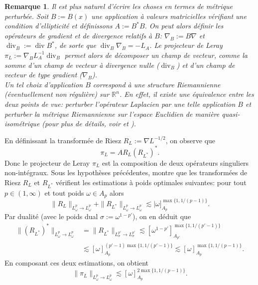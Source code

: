 \documentclass[11pt]{amsart}
\newtheorem*{remark}{Remarque}
\DeclareMathOperator{\dive}{div}
\newcommand{\rr}{\mathbb}
\begin{document}
\begin{remark} Il est plus naturel d'\'ecrire les choses en termes de m\'etrique perturb\'ee. Soit $B:=B(x)$ une application \`a valeurs matricielles v\'erifiant une condition d'ellipticit\'e et d\'efinissons $A:=B^* B$. On peut alors d\'efinir les op\'erateurs de gradient et de divergence relatifs \`a $B$: $\nabla_B:=B \nabla $ et $\dive_B:=\dive B^{*}$, de sorte que $\dive_B \nabla_B = -L_A$. Le projecteur de Leray $\pi_L:=\nabla_B L_A^{-1} \dive_B$ permet alors de d\'ecomposer un champ de vecteur, comme la somme d'un champ de vecteur \`a divergence nulle ($\dive_B$) et d'un champ de vecteur de type gradient ($\nabla_B$). \\
Un tel choix d'application $B$ correspond \`a une structure Riemannienne (\'eventuellement non r\'eguli\`ere) sur ${\rr R}^n$. En effet, il existe une \'equivalence entre les deux points de vue: perturber l'op\'erateur Laplacien par une telle application $B$ et perturber la m\'etrique Riemannienne sur l'espace Euclidien de mani\`ere quasi-isom\'etrique (pour plus de d\'etails, voir \cite{Barbatis} et \cite[Section 4]{CoulhonDungey}).
\end{remark}

\medskip

En d\'efinissant la transform\'ee de Riesz $R_L:=\nabla L^{-1/2}$, on observe que
$$ \pi_L=  A R_L \left(R_{L^*}\right)^*.$$
Donc le projecteur de Leray $\pi_L$ est la composition de deux op\'erateurs singuliers non-int\'egraux. Sous les hypoth\`eses pr\'ec\'edentes, \cite{BernicotFreyPetermichl} montre que les transform\'ees de Riesz $R_L$ et $R_{L^*}$ v\'erifient les estimations \`a poids optimales suivantes: pour tout $p\in(1,\infty)$ et tout poids $\omega \in A_p$ alors
$$ \| R_L \|_{L^p_\omega \to L^p_\omega} + \| R_{L^*} \|_{L^p_\omega \to L^p_\omega} \lesssim |\omega]_{A_p}^{\max\{1,1/(p-1)\}}.$$
Par dualit\'e (avec le poids dual $\sigma:=\omega^{1-p'}$), on en d\'eduit que
\begin{align*}
 \| \left(R_{L^*}\right)^{*} \|_{L^p_\omega \to L^p_\omega} & = \| R_{L^*} \|_{L^{p'}_{\sigma} \to L^{p'}_{\sigma}} \lesssim [\omega^{1-p'}]_{A_{p'}}^{\max\{1,1/(p'-1)\}} \\
 & \lesssim [\omega]_{A_{p}}^{(p'-1)\max\{1,1/(p'-1)\}} \lesssim [\omega]_{A_{p}}^{\max\{1,1/(p-1)\}}.
 \end{align*}
 En composant ces deux estimations, on obtient
 $$ \| \pi_L\|_{L^p_\omega \to L^p_\omega} \lesssim [\omega]_{A_{p}}^{2\max\{1,1/(p-1)\}}.$$
\end{document}
